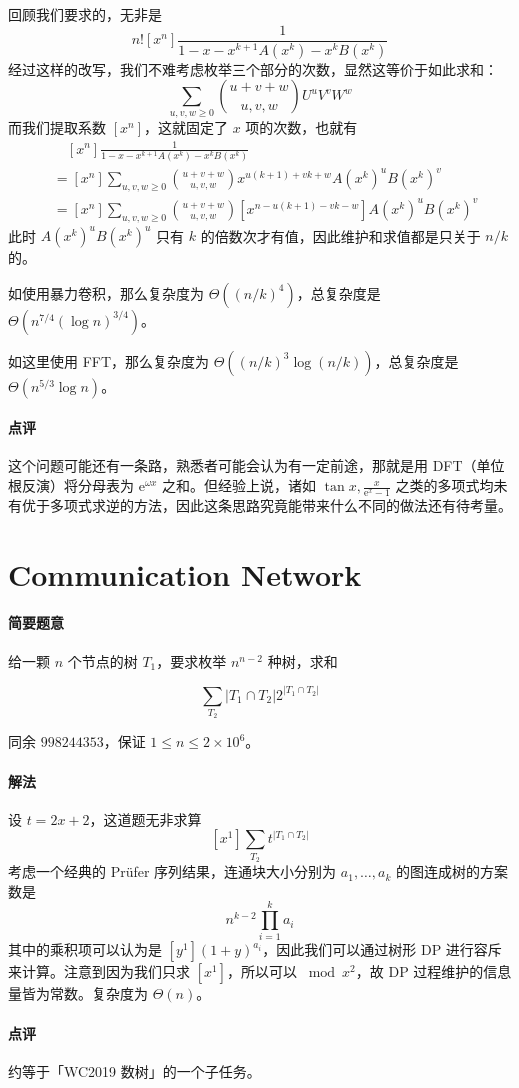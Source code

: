 \documentclass[12pt]{ctexart}
\theoremstyle{theorem}
\theoremstyle{theorem}
\begin{document}
回顾我们要求的，无非是
$$
n![x^n] \frac 1{1-x-x^{k+1}A(x^k)-x^kB(x^k)}
$$
经过这样的改写，我们不难考虑枚举三个部分的次数，显然这等价于如此求和：
$$
\sum_{u,v,w\ge 0} \binom{u+v+w}{u,v,w} U^uV^vW^w 
$$
而我们提取系数 $[x^n]$，这就固定了 $x$ 项的次数，也就有
\begin{align*}
&\quad [x^n] \frac 1{1-x-x^{k+1}A(x^k)-x^kB(x^k)}\\
&= [x^n]\sum_{u,v,w\ge 0} \binom{u+v+w}{u,v,w}x^{u(k+1)+vk+w}A(x^k)^uB(x^k)^v\\
&= [x^n]\sum_{u,v,w\ge 0} \binom{u+v+w}{u,v,w} [x^{n-u(k+1)-vk-w}] A(x^k)^uB(x^k)^v
\end{align*}
此时 $A(x^k)^uB(x^k)^u$ 只有 $k$ 的倍数次才有值，因此维护和求值都是只关于 $n/k$ 的。

如使用暴力卷积，那么复杂度为 $\Theta((n/k)^4)$，总复杂度是 $\Theta(n^{7/4}(\log n)^{3/4})$。

如这里使用 FFT，那么复杂度为 $\Theta((n/k)^3\log (n/k))$，总复杂度是 $\Theta(n^{5/3}\log n)$。

\paragraph{点评} 这个问题可能还有一条路，熟悉者可能会认为有一定前途，那就是用 DFT（单位根反演）将分母表为 $\mathrm{e}^{\omega x}$ 之和。但经验上说，诸如 $\tan x, \frac x{\mathrm e^x-1}$ 之类的多项式均未有优于多项式求逆的方法，因此这条思路究竟能带来什么不同的做法还有待考量。

\newpage

\section{Communication Network}

\paragraph{简要题意}

给一颗 $n$ 个节点的树 $T_1$，要求枚举 $n^{n-2}$ 种树，求和

$$
\sum_{T_2} |T_1 \cap T_2|2^{|T_1 \cap T_2|}
$$

同余 $998244353$，保证 $1\le n\le 2\times 10^6$。

\paragraph{解法}

设 $t=2x+2$，这道题无非求算
$$
[x^1] \sum_{T_2} t^{|T_1 \cap T_2|}
$$
考虑一个经典的 Pr\"ufer 序列结果，连通块大小分别为 $a_1,\dots,a_k$ 的图连成树的方案数是
$$
n^{k-2}\prod_{i=1}^k a_i
$$
其中的乘积项可以认为是 $[y^1](1+y)^{a_i}$，因此我们可以通过树形 DP 进行容斥来计算。注意到因为我们只求 $[x^1]$，所以可以 $\bmod x^2$，故 DP 过程维护的信息量皆为常数。复杂度为 $\Theta(n)$。

\paragraph{点评} 约等于「WC2019 数树」的一个子任务。
\end{document}
